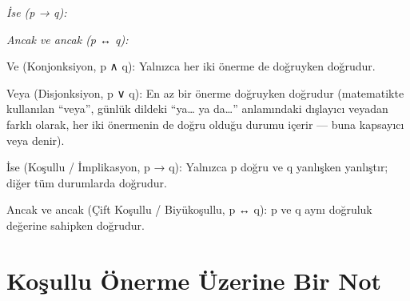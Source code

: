 \par\smallskip\begin{center}{\small\itshape\sffamily\color{gray}İse (p → q):}\par{}\end{center}\par\smallskip

\par\smallskip\begin{center}{\small\itshape\sffamily\color{gray}Ancak ve ancak (p ↔ q):}\par{}\end{center}\par\smallskip

Ve (Konjonksiyon, p ∧ q): Yalnızca her iki önerme de doğruyken doğrudur.

Veya (Disjonksiyon, p ∨ q): En az bir önerme doğruyken doğrudur (matematikte kullanılan “veya”, günlük dildeki “ya… ya da…” anlamındaki dışlayıcı veyadan farklı olarak, her iki önermenin de doğru olduğu durumu içerir — buna kapsayıcı veya denir).

İse (Koşullu / İmplikasyon, p → q): Yalnızca p doğru ve q yanlışken yanlıştır; diğer tüm durumlarda doğrudur.

Ancak ve ancak (Çift Koşullu / Biyükoşullu, p ↔ q): p ve q aynı doğruluk değerine sahipken doğrudur.

\section{Koşullu Önerme Üzerine Bir Not}


